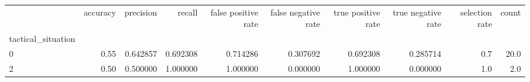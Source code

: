 \begin{tabular}{lrrrrrrrrr}
\toprule
{} &  accuracy &  precision &    recall &  false positive rate &  false negative rate &  true positive rate &  true negative rate &  selection rate &  count \\
tactical\_situation &           &            &           &                      &                      &                     &                     &                 &        \\
\midrule
0                  &      0.55 &   0.642857 &  0.692308 &             0.714286 &             0.307692 &            0.692308 &            0.285714 &             0.7 &   20.0 \\
2                  &      0.50 &   0.500000 &  1.000000 &             1.000000 &             0.000000 &            1.000000 &            0.000000 &             1.0 &    2.0 \\
\bottomrule
\end{tabular}
